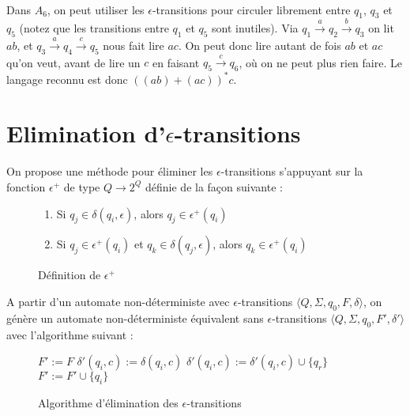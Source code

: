 \documentclass{article}[11pt]
\theoremstyle{definition}
\begin{document}
\paragraph*{}Dans $A_6$, on peut utiliser les $\epsilon$-transitions pour circuler librement entre $q_1$, $q_3$ et $q_5$ (notez que les transitions entre $q_1$ et $q_5$ sont inutiles). Via $q_1 \xrightarrow{a} q_2 \xrightarrow{b} q_3$ on lit $ab$, et $q_3 \xrightarrow{a} q_4 \xrightarrow{c} q_5$ nous fait lire $ac$. On peut donc lire autant de fois $ab$ et $ac$ qu'on veut, avant de lire un $c$ en faisant $q_5 \xrightarrow{c} q_6$, où on ne peut plus rien faire. Le langage reconnu est donc $((ab)+(ac))^*c$.


\section{Elimination d'$\epsilon$-transitions}

On propose une méthode pour éliminer les $\epsilon$-transitions s'appuyant sur la fonction $\epsilon^+$ de type $Q \rightarrow 2^Q$ définie de la façon suivante :

\begin{figure}[!h]
\begin{enumerate}
\item Si $q_j \in \delta(q_i,\epsilon)$, alors $q_j \in \epsilon^+(q_i)$
\item Si $q_j \in \epsilon^+(q_i)$ et $q_k \in \delta(q_j,\epsilon)$, alors $q_k \in \epsilon^+(q_i)$
\end{enumerate}
\caption{Définition de $\epsilon^+$}
\label{eplusdef}
\end{figure}
 
 
A partir d'un automate non-déterministe avec $\epsilon$-transitions  $\big \langle Q,\Sigma,q_0,F,\delta \big \rangle$, on génère un automate non-déterministe équivalent sans $\epsilon$-transitions  $\big \langle Q,\Sigma,q_0,F',\delta' \big \rangle$ avec l'algorithme suivant :

\begin{figure}[!h]
\begin{algorithmic}[1]
\State $F' := F$
        $\delta'(q_i,c) := \delta(q_i,c)$
    \EndFor
\EndFor
{}
			\State $\delta'(q_i,c) := \delta'(q_i,c) \cup \{q_r\}$
		\EndFor
			\State $F' := F' \cup \{q_i\}$
		\EndIf
	\EndFor
\EndFor
\end{algorithmic}
\caption{Algorithme d'élimination des $\epsilon$-transitions}
\label{algo}
\end{figure}
\vspace{2cm}
\end{document}
